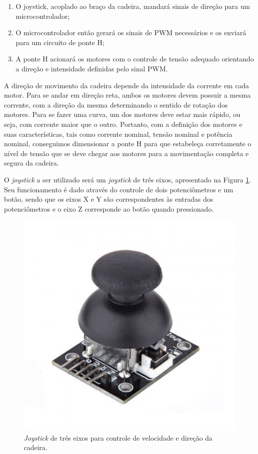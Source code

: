 \begin{enumerate}
\item O  joystick, acoplado ao braço da cadeira, 
mandará sinais de direção para um microcontrolador;
\item O microcontrolador então gerará os sinais de 
PWM necessários e os enviará para um circuito de ponte H;
\item A ponte H acionará os motores com o controle de 
tensão adequado orientando a direção e intensidade definidas pelo sinal PWM.
\end{enumerate}

A direção de movimento da cadeira depende da intensidade 
da corrente em cada motor. Para se andar em direção reta, 
ambos os motores devem possuir a mesma corrente, com a direção 
da mesma determinando o sentido de rotação dos motores. Para se 
fazer uma curva, um dos motores deve estar mais rápido, ou seja, 
com corrente maior que o outro. Portanto, com a definição 
dos motores e suas características, tais como corrente nominal, 
tensão nominal e potência nominal, conseguimos dimensionar 
a ponte H para que estabeleça corretamente o nível de tensão que 
se deve chegar aos motores para a movimentação completa e segura da cadeira.

O \textit{joystick} a ser utilizado será um \textit{joystick} 
de três eixos, apresentado na Figura \ref{fig:joystick}. Seu funcionamento é dado através do controle de 
dois potenciômetros e um botão, sendo que os eixos X e Y são 
correspondentes às entradas dos potenciômetros e o eixo Z corresponde ao botão quando pressionado.

\begin{figure}[H]
  \centering
    \includegraphics[width=\textwidth]{figuras/joystick.eps}
  \caption{\textit{Joystick} de três eixos para controle de velocidade e direção da cadeira.}
  \label{fig:joystick}
\end{figure}

